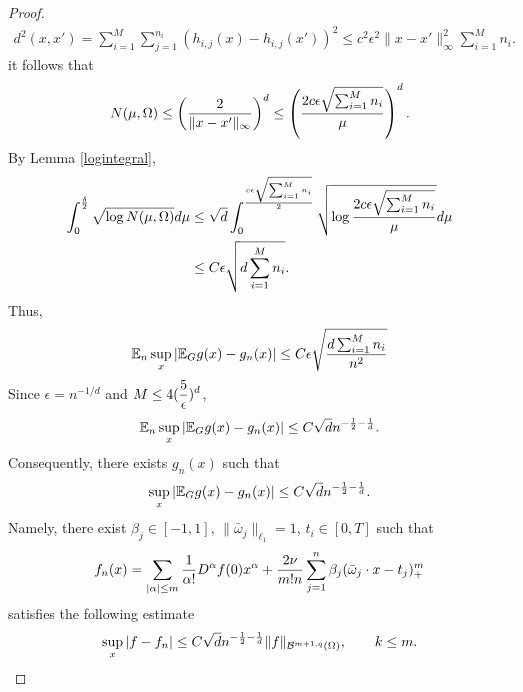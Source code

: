 \begin{proof}
\begin{align}
d^2(x, x') = \sum_{i=1}^M\sum_{j=1}^{n_i}(h_{i, j}(x) - h_{i, j}(x'))^2
 \le c^2\epsilon^2  \|x -x'\|_\infty^2\sum_{i=1}^M n_i.
\end{align}
it follows that
\begin{align} %
N(\mu, \Omega)\le \left ({2\over \|x -x'\|_\infty}\right)^d
\le \left ({2c\epsilon\sqrt{\sum_{i=1}^M n_i}\over \mu}\right)^d.
\end{align}
By Lemma \ref{logintegral},
\begin{align} %
\int_0^{\delta\over 2} \sqrt{\log N(\mu, \Omega)} d \mu 
&\le \sqrt{d}\int_0^{c\epsilon\sqrt{\sum_{i=1}^M n_i}\over 2} \sqrt{\log {2c\epsilon\sqrt{\sum_{i=1}^M n_i}\over \mu}} d \mu
\\
& \le C\epsilon\sqrt{d\sum_{i=1}^M n_i} .
\end{align}
Thus,
\begin{align}
\mathbb{E}_n\sup_x |\mathbb{E}_{G} g(x) - g_{n}(x)|
\le C\epsilon\sqrt{d\sum_{i=1}^M n_i\over n^2}
\end{align}
Since $\epsilon=n^{-1/d}$ and $\displaystyle M\le 4({5\over \epsilon})^d$,
\begin{align}
\mathbb{E}_n\sup_x |\mathbb{E}_{G} g(x) - g_{n}(x)|
\le C\sqrt{d} n^{-{1\over 2}- {1\over d}}.
\end{align}
Consequently, there exists $g_n(x)$ such that
$$
\sup_x |\mathbb{E}_{G} g(x) - g_{n}(x)|\le C\sqrt{d} n^{-{1\over 2}- {1\over d}}.
$$
Namely, there exist $\beta_j\in [-1, 1]$, $\|\bar \omega_j\|_{\ell_1}=1$, $t_i\in [0,T]$ such that 
$$
f_n(x)= \sum_{|\alpha|\le m}{1\over \alpha!}D^\alpha f(0) x^\alpha + {2\nu\over m!n}\sum_{j=1}^{n}\beta_j (\bar \omega_j\cdot x - t_j)_+^m
$$ 
satisfies the following estimate
\begin{equation}
\sup_x |f - f_n| \leq C\sqrt{d} n^{-{1\over 2}-{1\over d}}\|f\|_{\mathcal B^{m+1, q}(\Omega)},\qquad k\le m.
\end{equation}  
%
%
%
%

\end{proof}
